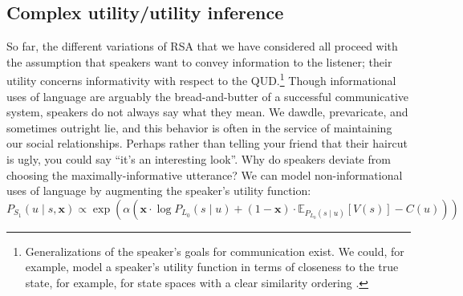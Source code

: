 \documentclass{sp}
\begin{document}
\subsection{Complex utility/utility inference}
\label{sec:compl-util-infer}
 
 So far, the different variations of RSA that we have considered all proceed with the assumption that speakers want to convey information to the listener; their utility concerns informativity with respect to the QUD.\footnote{Generalizations of the speaker's goals for communication exist. We could, for example, model a speaker's utility function in terms of closeness to the true state, for example, for state spaces with a clear similarity ordering \citep{Franke2014:Typical-use-of-}.} Though informational uses of language are arguably the bread-and-butter of a successful communicative system, speakers do not always say what they mean. We dawdle, prevaricate, and sometimes outright lie, and this behavior is often in the service of maintaining our social relationships. Perhaps rather than telling your friend that their haircut is ugly, you could say ``it's an interesting look''. Why do speakers deviate from choosing the maximally-informative utterance? We can model non-informational uses of language by augmenting the speaker's utility function: 
%
 \begin{equation} \label{S1-polite}
P_{S_1}(u \mid s, \textbf{x}) \propto \exp (\alpha  (
 \textbf{x} \cdot \log P_{L_0}(s \mid u) +
 (1 - \textbf{x}) \cdot  \mathbb{E}_{P_{L_0}(s \mid u)}[V(s)] - C(u)))
\end{equation}
\end{document}
